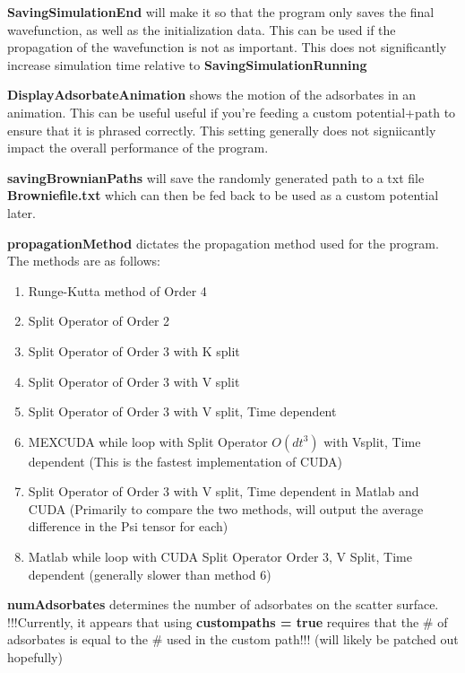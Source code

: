 \documentclass[11pt,letterpaper]{article}
\renewcommand{\\}{\bigskip}
\begin{document}
\textbf{SavingSimulationEnd} will make it so that the program only saves the final wavefunction, as well as the initialization data. This can be used if the propagation of the wavefunction is not as important. This does not significantly increase simulation time relative to \textbf{SavingSimulationRunning}\\

\textbf{DisplayAdsorbateAnimation} shows the motion of the adsorbates in an animation. This can be useful useful if you're feeding a custom potential+path to ensure that it is phrased correctly. This setting generally does not signiicantly impact the overall performance of the program.\\

\textbf{savingBrownianPaths} will save the randomly generated path to a txt file \textbf{Browniefile.txt} which can then be fed back to be used as a custom potential later.\\

\textbf{propagationMethod} dictates the propagation method used for the program. The methods are as follows:

\begin{enumerate}
    \item Runge-Kutta method of Order 4
    \item Split Operator of Order 2
    \item Split Operator of Order 3 with K split
    \item Split Operator of Order 3 with V split
    \item Split Operator of Order 3 with V split, Time dependent
    \item MEXCUDA while loop with Split Operator $O(dt^3)$ with Vsplit, Time dependent (This is the fastest implementation of CUDA)
    \item Split Operator of Order 3 with V split, Time dependent in Matlab and CUDA (Primarily to compare the two methods, will output the average difference in the Psi tensor for each)
    \item Matlab while loop with CUDA Split Operator Order 3, V Split, Time dependent (generally slower than method 6)
\end{enumerate}

\bigskip

\textbf{numAdsorbates} determines the number of adsorbates on the scatter surface. !!!Currently, it appears that using \textbf{custompaths = true} requires that the \# of adsorbates is equal to the \# used in the custom path!!! (will likely be patched out hopefully)\\
\end{document}
